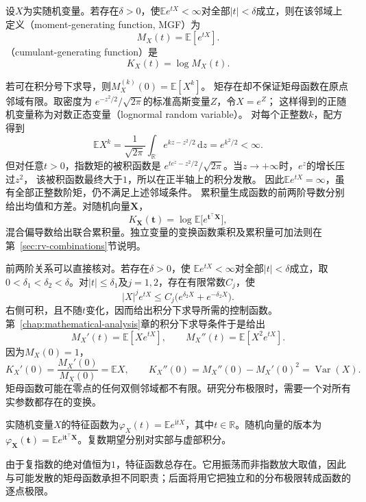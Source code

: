\begin{definition}[矩母函数与累积量生成函数]
  \label{def:probability-moment-generating-functions}
设\(X\)为实随机变量。若存在\(\delta>0\)，使\(\mathbb E e^{tX}<\infty\)对全部\(|t|<\delta\)成立，则在该邻域上定义（moment-generating function, MGF）为
\[ M_X(t)=\mathbb{E}[e^{tX}]. \]
（cumulant-generating function）是
\[ K_X(t)=\log M_X(t). \]
\end{definition}
若可在积分号下求导，则\(M_X^{(k)}(0)=\mathbb{E}[X^k]\)。
矩存在却不保证矩母函数在原点邻域有限。取密度为
\(e^{-z^2/2}/\sqrt{2\pi}\)的标准高斯变量\(Z\)，令\(X=e^Z\)；
这样得到的正随机变量称为对数正态变量（lognormal random variable）。
对每个正整数\(k\)，配方得到
\[
 \mathbb E X^k
 =\frac1{\sqrt{2\pi}}\int_{\mathbb R}e^{kz-z^2/2}\,\mathrm dz
 =e^{k^2/2}<\infty.
\]
但对任意\(t>0\)，指数矩的被积函数是
\(e^{te^z-z^2/2}/\sqrt{2\pi}\)。当\(z\to+\infty\)时，\(e^z\)的增长压过\(z^2\)，
该被积函数最终大于\(1\)，所以在正半轴上的积分发散。
因此\(\mathbb E e^{tX}=\infty\)，虽有全部正整数阶矩，仍不满足上述邻域条件。
累积量生成函数的前两阶导数分别给出均值和方差。对随机向量\(\bm{X}\)，
\[ K_{\bm{X}}(\bm{t})
  =\log\mathbb{E}\bigl[e^{\bm{t}^{\top}\bm{X}}\bigr], \]
混合偏导数给出联合累积量。独立变量的变换函数乘积及累积量可加法则在第~\ref{sec:rv-combinations}节说明。

前两阶关系可以直接核对。若存在\(\delta>0\)，使
\(\mathbb E e^{tX}<\infty\)对全部\(|t|<\delta\)成立，取\(0<\delta_1<\delta_2<\delta\)。对\(|t|\leq\delta_1\)及\(j=1,2\)，存在有限常数\(C_j\)，使
\[ |X|^j e^{tX}\leq C_j\bigl(e^{\delta_2X}+e^{-\delta_2X}\bigr). \]
右侧可积，且不随\(t\)变化，因而给出积分下求导所需的控制函数。第~\ref{chap:mathematical-analysis}章的积分下求导条件于是给出
\[
  M_X'(t)=\mathbb{E}[Xe^{tX}],\qquad
  M_X''(t)=\mathbb{E}[X^2e^{tX}].
\]
因为\(M_X(0)=1\)，
\[
  K_X'(0)=\frac{M_X'(0)}{M_X(0)}=\mathbb{E}X,
  \qquad
  K_X''(0)
  =M_X''(0)-M_X'(0)^2
  =\operatorname{Var}(X).
\]
矩母函数可能在零点的任何双侧邻域都不有限。研究分布极限时，需要一个对所有实参数都存在的变换。
\begin{definition}[特征函数]
  \label{def:probability-characteristic-function}
实随机变量\(X\)的特征函数为\(\varphi_X(t)=\mathbb E e^{\mathrm i tX}\)，其中\(t\in\mathbb R\)。随机向量的版本为\(\varphi_{\bm X}(\bm t)=\mathbb E e^{\mathrm i\bm t^\top\bm X}\)。复数期望分别对实部与虚部积分。
\end{definition}
由于复指数的绝对值恒为\(1\)，特征函数总存在。它用振荡而非指数放大取值，因此与可能发散的矩母函数承担不同职责；后面将用它把独立和的分布极限转成函数的逐点极限。

